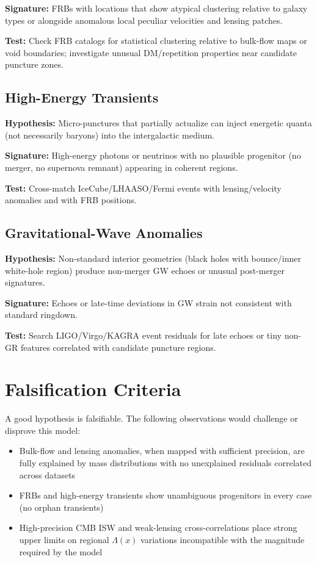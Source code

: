 \documentclass[11pt,a4paper]{article}
\begin{document}
\textbf{Signature:} FRBs with locations that show atypical clustering relative to galaxy types or alongside anomalous local peculiar velocities and lensing patches.

\textbf{Test:} Check FRB catalogs for statistical clustering relative to bulk-flow maps or void boundaries; investigate unusual DM/repetition properties near candidate puncture zones.

\subsection{High-Energy Transients}

\textbf{Hypothesis:} Micro-punctures that partially actualize can inject energetic quanta (not necessarily baryons) into the intergalactic medium.

\textbf{Signature:} High-energy photons or neutrinos with no plausible progenitor (no merger, no supernova remnant) appearing in coherent regions.

\textbf{Test:} Cross-match IceCube/LHAASO/Fermi events with lensing/velocity anomalies and with FRB positions.

\subsection{Gravitational-Wave Anomalies}

\textbf{Hypothesis:} Non-standard interior geometries (black holes with bounce/inner white-hole region) produce non-merger GW echoes or unusual post-merger signatures.

\textbf{Signature:} Echoes or late-time deviations in GW strain not consistent with standard ringdown.

\textbf{Test:} Search LIGO/Virgo/KAGRA event residuals for late echoes or tiny non-GR features correlated with candidate puncture regions.

\section{Falsification Criteria}

A good hypothesis is falsifiable. The following observations would challenge or disprove this model:

\begin{itemize}
\item Bulk-flow and lensing anomalies, when mapped with sufficient precision, are fully explained by mass distributions with no unexplained residuals correlated across datasets
\item FRBs and high-energy transients show unambiguous progenitors in every case (no orphan transients)
\item High-precision CMB ISW and weak-lensing cross-correlations place strong upper limits on regional $\Lambda(x)$ variations incompatible with the magnitude required by the model
\end{itemize}
\end{document}
